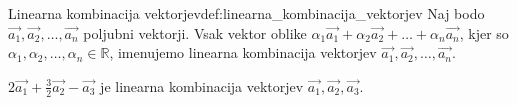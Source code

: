 \documentclass[a4,12pt]{article}
\newcommand{\R}{\mathbb{R}}
\begin{document}
    \begin{definition}{Linearna kombinacija vektorjev}{def:linearna_kombinacija_vektorjev}
        Naj bodo \(\vec{a_1}, \vec{a_2}, \ldots, \vec{a_n}\) poljubni vektorji. Vsak vektor oblike
        \(\alpha_1 \vec{a_1} + \alpha_2 \vec{a_2} + \ldots + \alpha_n \vec{a_n}\), kjer so \(\alpha_1, \alpha_2, \ldots, \alpha_n \in \R\),
        imenujemo linearna kombinacija vektorjev \(\vec{a_1}, \vec{a_2}, \ldots, \vec{a_n}\).
        \begin{example}
            \(2\vec{a_1} + \frac{3}{2} \vec{a_2} - \vec{a_3}\) je linearna kombinacija vektorjev \(\vec{a_1}, \vec{a_2}, \vec{a_3}\).
        \end{example}
    \end{definition}
\end{document}
